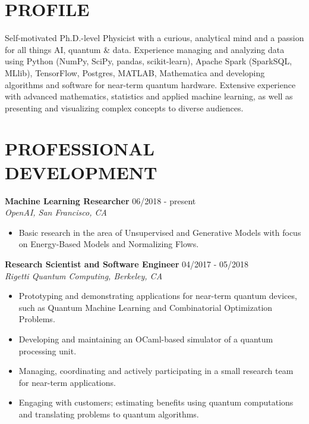\documentclass[10pt,centered]{./res} %
\begin{document}
\vspace*{-1.5cm}
\begin{resume}
\vspace{0.4cm}

\section{\color{ResumeBlue}PROFILE}
Self-motivated Ph.D.-level Physicist with a curious, analytical mind and a passion for all things AI, quantum \& data. Experience managing and analyzing data using Python (NumPy, SciPy, pandas, scikit-learn), Apache Spark (SparkSQL, MLlib), TensorFlow, Postgres, MATLAB, {\sc Mathematica} and developing algorithms and software for near-term quantum hardware. Extensive experience with advanced mathematics, statistics and applied machine learning, as well as presenting and visualizing complex concepts to diverse audiences.

\section{\color{ResumeBlue}PROFESSIONAL DEVELOPMENT}
{\bf Machine Learning Researcher} \hfill06/2018 - present \\
{\it OpenAI, San Francisco, CA}
\begin{itemize}
  \item Basic research in the area of Unsupervised and Generative Models with focus on Energy-Based Models and Normalizing Flows.
\end{itemize}

{\bf Research Scientist and Software Engineer} \hfill04/2017 - 05/2018 \\
{\it Rigetti Quantum Computing, Berkeley, CA}
\begin{itemize}
  \item Prototyping and demonstrating applications for near-term quantum devices, such as Quantum Machine Learning and Combinatorial Optimization Problems.
  \item Developing and maintaining an OCaml-based simulator of a quantum processing unit.
  \item Managing, coordinating and actively participating in a small research team for near-term applications.
  \item Engaging with customers; estimating benefits using quantum computations and translating problems to quantum algorithms.
\end{itemize}


\end{resume}
\end{document}
